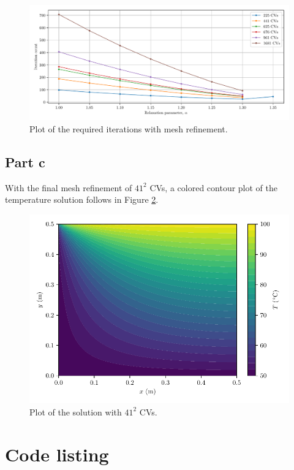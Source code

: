 \documentclass{article}
\begin{document}
\begin{figure}[H]
	\centering
	\includegraphics[width=\linewidth]{../results/b-iterations}
	\caption{Plot of the required iterations with mesh refinement.}
	\label{fig:b-iterations}
\end{figure}

\subsection*{Part c}

With the final mesh refinement of $41^2$ CVs, a colored contour plot of the temperature solution follows in Figure \ref{fig:c}.

\begin{figure}[H]
	\centering
	\includegraphics[width=0.7\linewidth]{../results/c}
	\caption{Plot of the solution with $41^2$ CVs.}
	\label{fig:c}
\end{figure}

\section*{Code listing}
\end{document}
